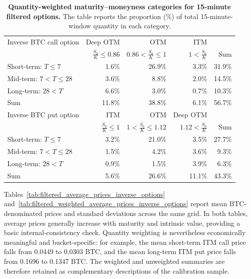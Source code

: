 \begin{table}[htbp]
\centering
\begin{tabular}{lrrrr}
\hline
Inverse BTC call option & Deep OTM & OTM & ITM & \\
 & $\frac{S_0}{K} \leq 0.86$ & $0.86 < \frac{S_0}{K} \leq 1$ & $1 < \frac{S_0}{K}$ & Sum \\
\hline
Short-term: $T \leq 7$ & 1.6\% & 26.9\% & 3.3\% & 31.9\% \\
Mid-term: $7 < T \leq 28$ & 3.6\% & 8.8\% & 2.0\% & 14.5\% \\
Long-term: $28 < T$ & 6.6\% & 3.0\% & 0.7\% & 10.3\% \\
Sum & 11.8\% & 38.8\% & 6.1\% & 56.7\% \\
\hline
Inverse BTC put option & ITM & OTM & Deep OTM & \\
 & $\frac{S_0}{K} \leq 1$ & $1 < \frac{S_0}{K} \leq 1.12$ & $1.12 < \frac{S_0}{K}$ & Sum \\
\hline
Short-term: $T \leq 7$ & 3.2\% & 21.0\% & 3.5\% & 27.7\% \\
Mid-term: $7 < T \leq 28$ & 1.5\% & 4.2\% & 3.6\% & 9.3\% \\
Long-term: $28 < T$ & 0.9\% & 1.5\% & 3.9\% & 6.3\% \\
Sum & 5.6\% & 26.6\% & 11.1\% & 43.3\% \\
\hline
\end{tabular}
\caption{\textbf{Quantity-weighted maturity--moneyness categories for 15-minute filtered options.} The table reports the proportion (\%) of total 15-minute-window quantity in each category.}
\label{tab:filtered_weighted_maturity_moneyness_categories}
\end{table}

Tables~\ref{tab:filtered_average_prices_inverse_options} and~\ref{tab:filtered_weighted_average_prices_inverse_options} report mean BTC-denominated prices and standard deviations across the same grid. In both tables, average prices generally increase with maturity and intrinsic value, providing a basic internal-consistency check. Quantity weighting is nevertheless economically meaningful and bucket-specific: for example, the mean short-term ITM call price falls from 0.0449 to 0.0303 BTC, and the mean long-term ITM put price falls from 0.1696 to 0.1347 BTC. The weighted and unweighted summaries are therefore retained as complementary descriptions of the calibration sample.

